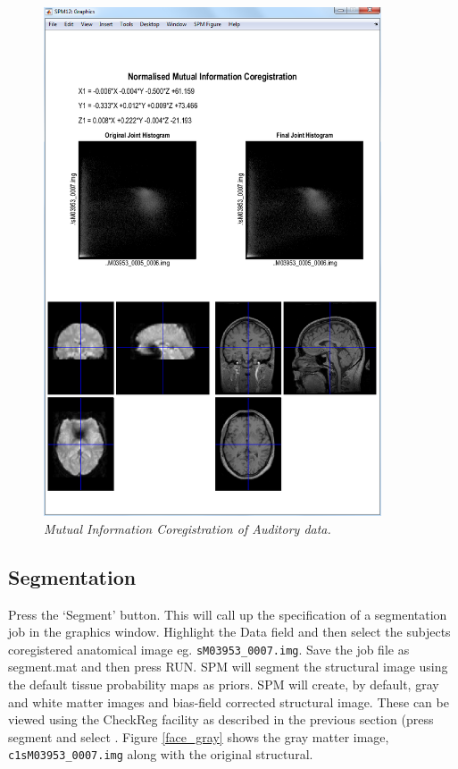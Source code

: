 \begin{figure}
\begin{center}
\includegraphics[width=100mm]{faces/coreg}
\caption{\em Mutual Information Coregistration  of Auditory data. \label{face_coreg}}
\end{center}
\end{figure}

\subsection{Segmentation}

Press the `Segment' button. This will call up the specification of a segmentation job in the graphics window. Highlight the Data field and then select the subjects coregistered anatomical image eg. \verb!sM03953_0007.img!. Save the job file as {\sf segment.mat} and then press RUN. SPM will segment the structural image using the default tissue probability maps as priors. SPM will create, by default, gray and white matter images and bias-field corrected structural image. These can be viewed using the CheckReg facility as described in the previous section (press segment and select . Figure \ref{face_gray} shows the gray matter image, \verb!c1sM03953_0007.img! along with the original structural.

